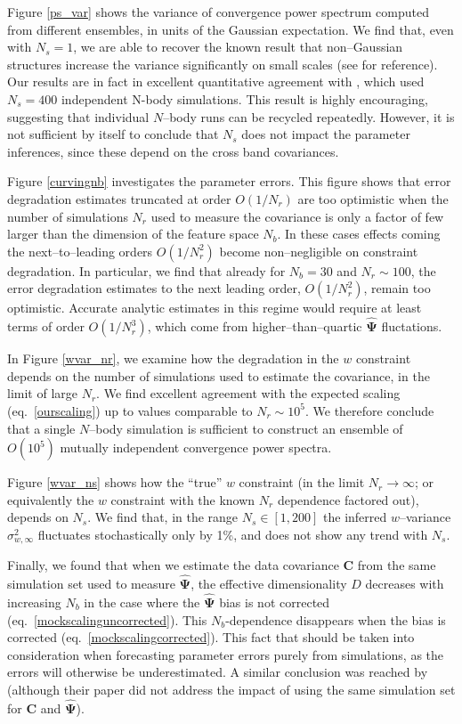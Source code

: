 \documentclass[reprint,aps,prd,superscriptaddress,showkeys,showpacs]{revtex4-1}
\newcommand{\bb}[1]{\mathbf{#1}}
\newcommand{\bbh}[1]{\mathbf{\hat{#1}}}
\begin{document}
Figure \ref{ps_var} shows the variance of convergence power spectrum
computed from different ensembles, in units of the Gaussian
expectation. We find that, even with $N_s=1$, we are able to recover
the known result that non--Gaussian structures increase the variance
significantly on small scales (see \citep{Sato12,TakadaSpergel14} for
reference).  Our results are in fact in excellent quantitative
agreement with \citep{Sato12}, which used $N_s=400$ independent N-body
simulations.  This result is highly encouraging, suggesting that
individual $N$--body runs can be recycled repeatedly.  However, it is
not sufficient by itself to conclude that $N_s$ does not impact the
parameter inferences, since these depend on the cross band
covariances.

Figure \ref{curvingnb} investigates the parameter errors. This figure
shows that error degradation estimates truncated at order $O(1/N_r)$
are too optimistic when the number of simulations $N_r$ used to
measure the covariance is only a factor of few larger than the
dimension of the feature space $N_b$. In these cases effects coming
the next--to--leading orders $O(1/N_r^2)$ become non--negligible on
constraint degradation. In particular, we find that already for
$N_b=30$ and $N_r\sim100$, the error degradation estimates to the next
leading order, $O(1/N_r^2)$, remain too optimistic. Accurate analytic
estimates in this regime would require at least terms of order
$O(1/N_r^3)$, which come from higher--than--quartic $\bbh{\Psi}$
fluctations.

In Figure \ref{wvar_nr}, we examine how the degradation in the $w$
constraint depends on the number of simulations used to estimate the
covariance, in the limit of large $N_r$. We find excellent agreement
with the expected scaling (eq.~\ref{ourscaling}) up to values
comparable to $N_r\sim 10^5$. We therefore conclude that a single
$N$--body simulation is sufficient to construct an ensemble of
$O(10^5)$ mutually independent convergence power spectra.

Figure \ref{wvar_ns} shows how the ``true'' $w$ constraint (in the
limit $N_r\rightarrow \infty$; or equivalently the $w$ constraint with
the known $N_r$ dependence factored out), depends on $N_s$. We find
that, in the range $N_s\in[1,200]$ the inferred $w$--variance
$\sigma_{w,\infty}^2$ fluctuates stochastically only by 1\%, and does
not show any trend with $N_s$.

Finally, we found that when we estimate the data covariance $\bb{C}$
from the same simulation set used to measure $\bbh{\Psi}$, the
effective dimensionality $D$ decreases with increasing $N_b$ in the
case where the $\bbh{\Psi}$ bias is not corrected
(eq.~\ref{mockscalinguncorrected}).  This $N_b$-dependence disappears
when the bias is corrected (eq.~\ref{mockscalingcorrected}).  This
fact that should be taken into consideration when forecasting
parameter errors purely from simulations, as the errors will otherwise
be underestimated. A similar conclusion was reached by
\citep{Hartlap07} (although their paper did not address the impact of
using the same simulation set for $\bb{C}$ and $\bbh{\Psi}$).
\end{document}
